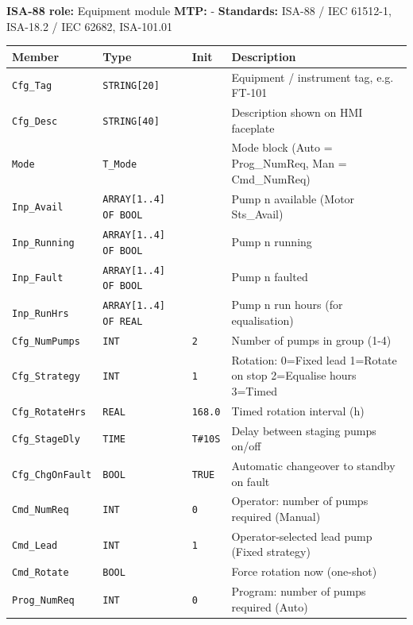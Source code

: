 {\small\textbf{ISA-88 role:} Equipment module \quad \textbf{MTP:} - \quad \textbf{Standards:} ISA-88 /\allowbreak{} IEC 61512-1, ISA-18.2 /\allowbreak{} IEC 62682, ISA-101.01}
{\footnotesize
\begin{longtable}{@{}>{\raggedright\arraybackslash}p{3.4cm}>{\raggedright\arraybackslash}p{3.3cm}>{\raggedright\arraybackslash}p{1.3cm}>{\raggedright\arraybackslash}p{6.4cm}@{}}
\toprule
\rowcolor{tblhead}\textbf{Member} & \textbf{Type} & \textbf{Init} & \textbf{Description} \\
\midrule
\endhead
\texttt{Cfg\_Tag} & \texttt{STRING[20]} &  & Equipment /\allowbreak{} instrument tag, e.g. FT-101 \\
\texttt{Cfg\_Desc} & \texttt{STRING[40]} &  & Description shown on HMI faceplate \\
\texttt{Mode} & \texttt{T\_Mode} &  & Mode block (Auto = Prog\_NumReq, Man = Cmd\_NumReq) \\
\texttt{Inp\_Avail} & \texttt{ARRAY[1..4] OF BOOL} &  & Pump n available (Motor Sts\_Avail) \\
\texttt{Inp\_Running} & \texttt{ARRAY[1..4] OF BOOL} &  & Pump n running \\
\texttt{Inp\_Fault} & \texttt{ARRAY[1..4] OF BOOL} &  & Pump n faulted \\
\texttt{Inp\_RunHrs} & \texttt{ARRAY[1..4] OF REAL} &  & Pump n run hours (for equalisation) \\
\texttt{Cfg\_NumPumps} & \texttt{INT} & \texttt{2} & Number of pumps in group (1-4) \\
\texttt{Cfg\_Strategy} & \texttt{INT} & \texttt{1} & Rotation: 0=Fixed lead 1=Rotate on stop 2=Equalise hours 3=Timed \\
\texttt{Cfg\_RotateHrs} & \texttt{REAL} & \texttt{168.0} & Timed rotation interval (h) \\
\texttt{Cfg\_StageDly} & \texttt{TIME} & \texttt{T\#10S} & Delay between staging pumps on/\allowbreak{}off \\
\texttt{Cfg\_ChgOnFault} & \texttt{BOOL} & \texttt{TRUE} & Automatic changeover to standby on fault \\
\texttt{Cmd\_NumReq} & \texttt{INT} & \texttt{0} & Operator: number of pumps required (Manual) \\
\texttt{Cmd\_Lead} & \texttt{INT} & \texttt{1} & Operator-selected lead pump (Fixed strategy) \\
\texttt{Cmd\_Rotate} & \texttt{BOOL} &  & Force rotation now (one-shot) \\
\texttt{Prog\_NumReq} & \texttt{INT} & \texttt{0} & Program: number of pumps required (Auto) \\

\end{longtable}}
